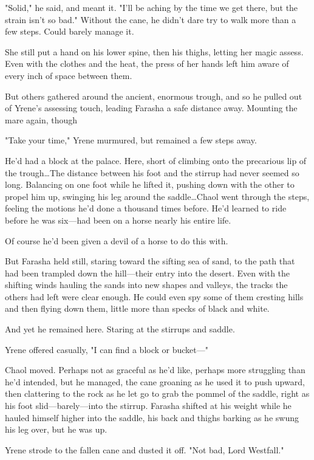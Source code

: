 "Solid," he said, and meant it.
"I'll be aching by the time we get there, but the strain isn't so bad."
Without the cane, he didn't dare try to walk more than a few steps.
Could barely manage it.

She still put a hand on his lower spine, then his thighs, letting her magic assess.
Even with the clothes and the heat, the press of her hands left him aware of every inch of space between them.

But others gathered around the ancient, enormous trough, and so he pulled out of Yrene's assessing touch, leading Farasha a safe distance away.
Mounting the mare again, though 

"Take your time," Yrene murmured, but remained a few steps away.

He'd had a block at the palace.
Here, short of climbing onto the precarious lip of the trough\ldots The distance between his foot and the stirrup had never seemed so long.
Balancing on one foot while he lifted it, pushing down with the other to propel him up, swinging his leg around the saddle\ldots Chaol went through the steps, feeling the motions he'd done a thousand times before.
He'd learned to ride before he was six---had been on a horse nearly his entire life.

Of course he'd been given a devil of a horse to do this with.

But Farasha held still, staring toward the sifting sea of sand, to the path that had been trampled down the hill---their entry into the desert.
Even with the shifting winds hauling the sands into new shapes and valleys, the tracks the others had left were clear enough.
He could even spy some of them cresting hills and then flying down them, little more than specks of black and white.

And yet he remained here.
Staring at the stirrups and saddle.

Yrene offered casually, "I can find a block or bucket---"

Chaol moved.
Perhaps not as graceful as he'd like, perhaps more struggling than he'd intended, but he managed, the cane groaning as he used it to push upward, then clattering to the rock as he let go to grab the pommel of the saddle, right as his foot slid---barely---into the stirrup.
Farasha shifted at his weight while he hauled himself higher into the saddle, his back and thighs barking as he swung his leg over, but he was up.

Yrene strode to the fallen cane and dusted it off.
"Not bad, Lord Westfall."

